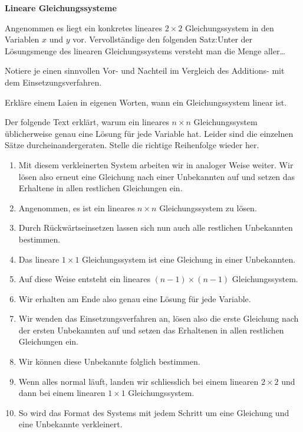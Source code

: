 \documentclass[11pt]{exam}
\newcommand{\theme}{Lineare Gleichungssysteme}
\begin{document}
\fontsize{14}{14}\selectfont
\begin{center}
    \huge\bf\theme
\end{center}

\begin{questions}
\question[4]
Angenommen es liegt ein konkretes lineares $2\times2$ Gleichungssystem in den Variablen $x$ und $y$ vor. Vervollständige den folgenden Satz:\newline\flqq Unter der Lösungsmenge des linearen Gleichungssystems versteht man die Menge aller\ldots\frqq


\question[2]
Notiere je einen sinnvollen Vor- und Nachteil im Vergleich des Additions- mit dem Einsetzungsverfahren.


\question[4]
Erkläre einem Laien in eigenen Worten, wann ein Gleichungssystem linear ist.


\question[5] %
Der folgende Text erklärt, warum ein lineares $n\times n$ Gleichungssystem üblicherweise genau eine Lösung für jede Variable hat. Leider sind die einzelnen Sätze durcheinandergeraten. Stelle die richtige Reihenfolge wieder her.
\begin{enumerate}
	\item Mit diesem verkleinerten System arbeiten wir in analoger Weise weiter. Wir lösen also erneut eine Gleichung nach einer Unbekannten auf und setzen das Erhaltene in allen restlichen Gleichungen ein.
	\item Angenommen, es ist ein lineares $n\times n$ Gleichungssystem zu lösen.
	\item Durch Rückwärtseinsetzen lassen sich nun auch alle restlichen Unbekannten bestimmen.
	\item Das lineare $1\times1$ Gleichungssystem ist eine Gleichung in einer Unbekannten.
	\item Auf diese Weise entsteht ein lineares $(n-1)\times(n-1)$ Gleichungssystem.
	\item Wir erhalten am Ende also genau eine Lösung für jede Variable.
	\item Wir wenden das Einsetzungsverfahren an, lösen also die erste Gleichung nach der ersten Unbekannten auf und setzen das Erhaltenen in allen restlichen Gleichungen ein.
	\item Wir können diese Unbekannte folglich bestimmen.
	\item Wenn alles normal läuft, landen wir schliesslich bei einem linearen $2\times2$ und dann bei einem linearen $1\times1$ Gleichungssystem.
	\item So wird das Format des Systems mit jedem Schritt um eine Gleichung und eine Unbekannte verkleinert.
\end{enumerate}



\end{questions}
\end{document}
